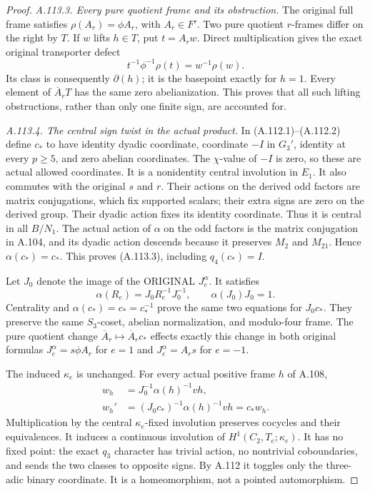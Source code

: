 \begin{proof}
\emph{A.113.3. Every pure quotient frame and its obstruction.}
The original full frame satisfies
\(\rho(A_r)=\phi A_r\), with \(A_r\in F'\).
Two pure quotient \(r\)-frames differ on the right by \(T\).
If \(w\) lifts \(h\in T\), put \(t=A_rw\). Direct multiplication
gives the exact original transporter defect
\[
       t^{-1}\phi^{-1}\rho(t)=w^{-1}\rho(w).
 \tag{A.113.4}
\]
Its class is consequently \(\partial(h)\); it is the basepoint
exactly for \(h=1\). Every element of \(\overline A_rT\) has the
same zero abelianization. This proves that all such lifting
obstructions, rather than only one finite sign, are accounted for.

\emph{A.113.4. The central sign twist in the actual product.}
In (A.112.1)--(A.112.2) define \(c_*\) to have identity dyadic
coordinate, coordinate \(-I\) in \(G_3'\), identity at every
\(p\geq5\), and zero abelian coordinates. The \(\chi\)-value
of \(-I\) is zero, so these are actual allowed coordinates.
It is a nonidentity central involution in \(E_1\).
It also commutes with the original \(s\) and \(r\).
Their actions on the derived odd factors are matrix conjugations,
which fix supported scalars; their extra signs are zero on the
derived group. Their dyadic action fixes its identity coordinate.
Thus it is central in all \(B/N_1\).
The actual action of \(\alpha\) on the odd factors is the matrix
conjugation in A.104, and its dyadic action descends because it
preserves \(M_2\) and \(M_{21}\). Hence \(\alpha(c_*)=c_*\).
This proves (A.113.3), including \(q_4(c_*)=I\).

Let \(J_0\) denote the image of the ORIGINAL \(J_e^\alpha\).
It satisfies
\[
 \alpha(R_e)=J_0R_e^{-1}J_0^{-1},\qquad \alpha(J_0)J_0=1.
\]
Centrality and \(\alpha(c_*)=c_*=c_*^{-1}\) prove the same
two equations for \(J_0c_*\). They preserve the same
\(S_3\)-coset, abelian normalization, and modulo-four frame.
The pure quotient change \(\overline A_r\mapsto\overline A_rc_*\)
effects exactly this change in both original formulas
\(J_e^\alpha=s\phi A_r\) for \(e=1\) and \(J_e^\alpha=A_rs\)
for \(e=-1\).

The induced \(\kappa_e\) is unchanged. For every actual
positive frame \(h\) of A.108,
\[
 \begin{split}
 w_h&=J_0^{-1}\alpha(h)^{-1}vh,\\
 w_h'&=(J_0c_*)^{-1}\alpha(h)^{-1}vh=c_*w_h.
 \end{split}
 \tag{A.113.5}
\]
Multiplication by the central \(\kappa_e\)-fixed involution
preserves cocycles and their equivalences. It induces a continuous
involution of \(H^1(C_2,T_e;\kappa_e)\).
It has no fixed point: the exact \(q_3\) character has trivial
action, no nontrivial coboundaries, and sends the two classes to
opposite signs. By A.112 it toggles only the three-adic binary
coordinate. It is a homeomorphism, not a pointed automorphism.


\end{proof}
